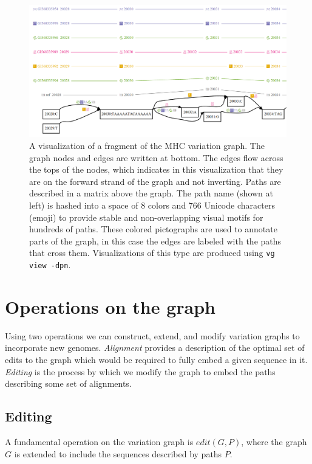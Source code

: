 \documentclass{article}
\begin{document}
\begin{figure}[t]
\centering
\includegraphics[width=1.0\textwidth]{figures/minimhc}
\caption{\label{fig:minimhc}
  A visualization of a fragment of the MHC variation graph.
  The graph nodes and edges are written at bottom. The edges flow across the tops of the nodes, which indicates in this visualization that they are on the forward strand of the graph and not inverting.
  Paths are described in a matrix above the graph.
  The path name (shown at left) is hashed into a space of 8 colors and 766 Unicode characters (emoji) to provide stable and non-overlapping visual motifs for hundreds of paths.
  These colored pictographs are used to annotate parts of the graph, in this case the edges are labeled with the paths that cross them.
  Visualizations of this type are produced using {\tt vg view -dpn}.
}
\end{figure}

\section{Operations on the graph}

Using two operations we can construct, extend, and modify variation graphs to incorporate new genomes.
\emph{Alignment} provides a description of the optimal set of edits to the graph which would be required to fully embed a given sequence in it.
\emph{Editing} is the process by which we modify the graph to embed the paths describing some set of alignments.

\subsection{Editing}

A fundamental operation on the variation graph is $edit(G, P)$, where the graph $G$ is extended to include the sequences described by paths $P$.
\end{document}
